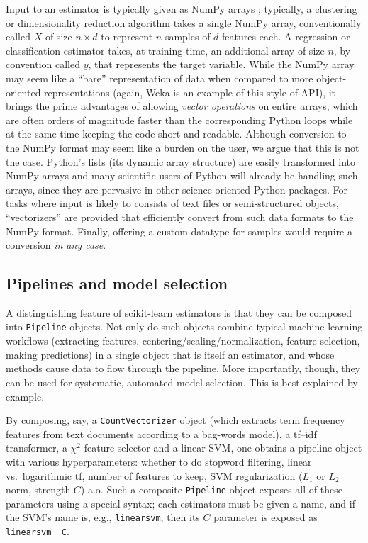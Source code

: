 Input to an estimator is typically given as NumPy arrays \citep{vanderwalt2011};
typically, a clustering or dimensionality reduction algorithm
takes a single NumPy array, conventionally called $X$ of size $n \times d$
to represent $n$ samples of $d$ features each.
A regression or classification estimator takes, at training time,
an additional array of size $n$, by convention called $y$,
that represents the target variable.
While the NumPy array may seem like a ``bare'' representation of data
when compared to more object-oriented representations
(again, Weka is an example of this style of API),
it brings the prime advantages of allowing \textit{vector operations}
on entire arrays,
which are often orders of magnitude faster than the corresponding Python loops
while at the same time keeping the code short and readable.
Although conversion to the NumPy format may seem like a burden on the user,
we argue that this is not the case.
Python's lists (its dynamic array structure)
are easily transformed into NumPy arrays
and many scientific users of Python will already be handling such arrays,
since they are pervasive in other science-oriented Python packages.
For tasks where input is likely to consists of text files
or semi-structured objects, ``vectorizers'' are provided
that efficiently convert from such data formats to the NumPy format.
Finally, offering a custom datatype for samples
would require a conversion \textit{in any case}.


\subsection{Pipelines and model selection}

A distinguishing feature of scikit-learn estimators
is that they can be composed into \texttt{Pipeline} objects.
Not only do such objects combine typical machine learning workflows
(extracting features, centering/scaling/normalization,
feature selection, making predictions)
in a single object that is itself an estimator,
and whose methods cause data to flow through the pipeline.
More importantly, though, they can be used for
systematic, automated model selection.
This is best explained by example.

By composing, say, a \texttt{CountVectorizer} object
(which extracts term frequency features from text documents
according to a bag-words model),
a \textsf{tf--idf} transformer, a $\chi^2$ feature selector and a linear SVM,
one obtains a pipeline object with various hyperparameters:
whether to do stopword filtering,
linear vs.\ logarithmic \textsf{tf}, number of features to keep,
SVM regularization ($L_1$ or $L_2$ norm, strength $C$) a.o.
Such a composite \texttt{Pipeline} object
exposes all of these parameters using a special syntax;
each estimators must be given a name,
and if the SVM's name is, e.g., \texttt{linearsvm},
then its $C$ parameter is exposed as \texttt{linearsvm\_\_C}.

